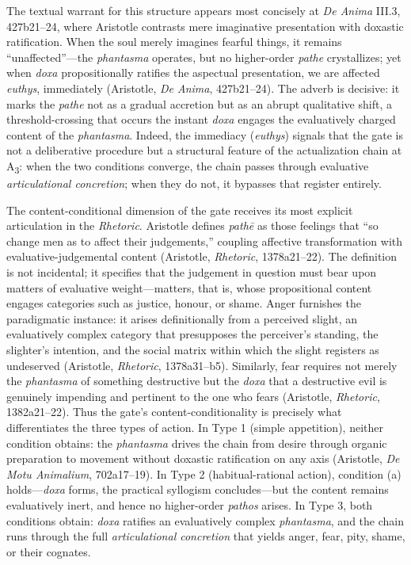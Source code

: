 \documentclass{article}
\begin{document}
The textual warrant for this structure appears most concisely at \textit{De Anima} III.3, 427b21--24, where Aristotle contrasts mere imaginative presentation with doxastic ratification. When the soul merely imagines fearful things, it remains ``unaffected''---the \textit{phantasma} operates, but no higher-order \textit{pathe} crystallizes; yet when \textit{doxa} propositionally ratifies the aspectual presentation, we are affected \textit{euthys}, immediately (Aristotle, \textit{De Anima}, 427b21--24). The adverb is decisive: it marks the \textit{pathe} not as a gradual accretion but as an abrupt qualitative shift, a threshold-crossing that occurs the instant \textit{doxa} engages the evaluatively charged content of the \textit{phantasma}. Indeed, the immediacy (\textit{euthys}) signals that the gate is not a deliberative procedure but a structural feature of the actualization chain at A\textsubscript{3}: when the two conditions converge, the chain passes through evaluative \textit{articulational concretion}; when they do not, it bypasses that register entirely.

The content-conditional dimension of the gate receives its most explicit articulation in the \textit{Rhetoric}. Aristotle defines \textit{pathē} as those feelings that ``so change men as to affect their judgements,'' coupling affective transformation with evaluative-judgemental content (Aristotle, \textit{Rhetoric}, 1378a21--22). The definition is not incidental; it specifies that the judgement in question must bear upon matters of evaluative weight---matters, that is, whose propositional content engages categories such as justice, honour, or shame. Anger furnishes the paradigmatic instance: it arises definitionally from a perceived slight, an evaluatively complex category that presupposes the perceiver's standing, the slighter's intention, and the social matrix within which the slight registers as undeserved (Aristotle, \textit{Rhetoric}, 1378a31--b5). Similarly, fear requires not merely the \textit{phantasma} of something destructive but the \textit{doxa} that a destructive evil is genuinely impending and pertinent to the one who fears (Aristotle, \textit{Rhetoric}, 1382a21--22). Thus the gate's content-conditionality is precisely what differentiates the three types of action. In Type 1 (simple appetition), neither condition obtains: the \textit{phantasma} drives the chain from desire through organic preparation to movement without doxastic ratification on any axis (Aristotle, \textit{De Motu Animalium}, 702a17--19). In Type 2 (habitual-rational action), condition (a) holds---\textit{doxa} forms, the practical syllogism concludes---but the content remains evaluatively inert, and hence no higher-order \textit{pathos} arises. In Type 3, both conditions obtain: \textit{doxa} ratifies an evaluatively complex \textit{phantasma}, and the chain runs through the full \textit{articulational concretion} that yields anger, fear, pity, shame, or their cognates.
\end{document}
